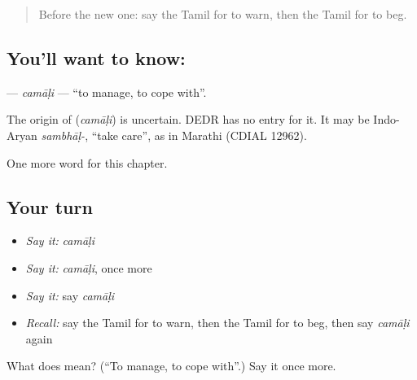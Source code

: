 \label{lesson:TA-C231-camali}



\begin{quote}
Before the new one: say the Tamil for to warn, then the Tamil for to beg.
\end{quote}

\subsection*{You'll want to know: }
\textbf{} — \emph{camāḷi} — \textquotedblleft{}to manage, to cope with\textquotedblright{}.

\begin{cousinweb}
The origin of \textbf{} (\emph{camāḷi}) is uncertain. DEDR has no entry for it. It may be Indo-Aryan \emph{sambhāḷ-}, \textquotedblleft{}take care\textquotedblright{}, as in Marathi (CDIAL 12962).
\end{cousinweb}

\begin{grammarlens}[title={What you've built}]
One more word for this chapter.
\end{grammarlens}

\subsection*{Your turn}
\begin{itemize}
\raggedright
  \item \emph{Say it:} \emph{camāḷi}
  \item \emph{Say it:} \emph{camāḷi}, once more
  \item \emph{Say it:} say \emph{camāḷi}
  \item \emph{Recall:} say the Tamil for to warn, then the Tamil for to beg, then say \emph{camāḷi} again
\end{itemize}

\begin{tcolorbox}[breakable,colback=teal!4,colframe=teal!35!black,title={Before you move on}]
What does  mean? (\textquotedblleft{}To manage, to cope with\textquotedblright{}.) Say it once more.
\end{tcolorbox}
